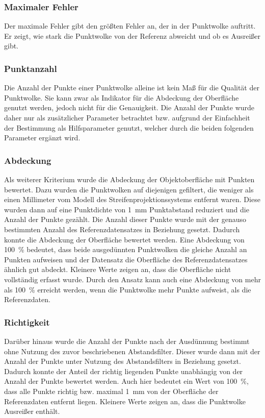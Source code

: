 \documentclass[./00PhotoBox.tex]{subfiles}
\begin{document}
\subsubsection{Maximaler Fehler}

Der maximale Fehler gibt den größten Fehler an, der in der Punktwolke auftritt. Er zeigt, wie stark die Punktwolke von der Referenz abweicht und ob es Ausreißer gibt.


\subsubsection{Punktanzahl}
Die Anzahl der Punkte einer Punktwolke alleine ist kein Maß für die Qualität der Punktwolke. Sie kann zwar als Indikator für die Abdeckung der Oberfläche genutzt werden, jedoch nicht für die Genauigkeit. Die Anzahl der Punkte wurde daher nur als zusätzlicher Parameter betrachtet bzw. aufgrund der Einfachheit der Bestimmung als Hilfsparameter genutzt, welcher durch die beiden folgenden Parameter ergänzt wird.

\subsubsection{Abdeckung}
\label{ss:abdeckung}
Als weiterer Kriterium wurde die Abdeckung der Objektoberfläche mit Punkten bewertet. Dazu wurden die Punktwolken auf diejenigen gefiltert, die weniger als einen Millimeter vom Modell des Streifenprojektionssystems entfernt waren. Diese wurden dann auf eine Punktdichte von \SI{1}{\milli\metre} Punktabstand reduziert und die Anzahl der Punkte gezählt. Die Anzahl dieser Punkte wurde mit der genauso bestimmten Anzahl des Referenzdatensatzes in Beziehung gesetzt. Dadurch konnte die Abdeckung der Oberfläche bewertet werden. Eine Abdeckung von \SI{100}{\percent} bedeutet, dass beide ausgedünnten Punktwolken die gleiche Anzahl an Punkten aufweisen und der Datensatz die Oberfläche des Referenzdatensatzes ähnlich gut abdeckt. Kleinere Werte zeigen an, dass die Oberfläche nicht vollständig erfasst wurde. Durch den Ansatz kann auch eine Abdeckung von mehr als \SI{100}{\percent} erreicht werden, wenn die Punktwolke mehr Punkte aufweist, als die Referenzdaten.

\subsubsection{Richtigkeit}
Darüber hinaus wurde die Anzahl der Punkte nach der Ausdünnung bestimmt ohne Nutzung des zuvor beschriebenen Abstandsfilter. Dieser wurde dann mit der Anzahl der Punkte unter Nutzung des Abstandsfilters in Beziehung gesetzt. Dadurch konnte der Anteil der richtig liegenden Punkte unabhängig von der Anzahl der Punkte bewertet werden. Auch hier bedeutet ein Wert von \SI{100}{\percent}, dass alle Punkte richtig bzw. maximal \SI{1}{\milli\metre} von der Oberfläche der Referenzdaten entfernt liegen. Kleinere Werte zeigen an, dass die Punktwolke Ausreißer enthält.
\end{document}
